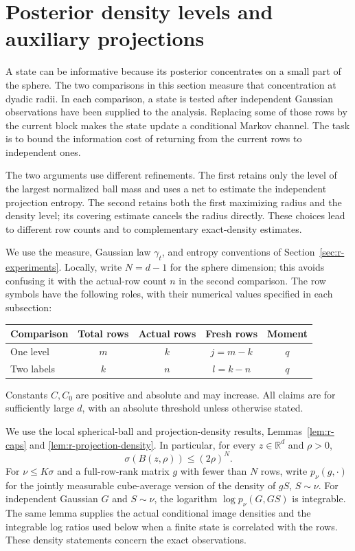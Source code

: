 \section{Posterior density levels and auxiliary projections}
\label{rlevels:section}\label{sec:r-density-levels}

A state can be informative because its posterior concentrates on a small
part of the sphere.  The two comparisons in this section measure that
concentration at dyadic radii.  In each comparison, a state is tested
after independent Gaussian observations have been supplied to the
analysis.  Replacing some of those rows by the current block makes the
state update a conditional Markov channel.  The task is to bound the
information cost of returning from the current rows to independent ones.

The two arguments use different refinements.  The first retains only
the level of the largest normalized ball mass and uses a net to estimate
the independent projection entropy.  The second retains both the first
maximizing radius and the density level; its covering estimate cancels
the radius directly.  These choices lead to different row counts and
to complementary exact-density estimates.

We use the measure, Gaussian law \(\gamma_t\), and entropy conventions
of Section~\ref{sec:r-experiments}.  Locally, write \(N=d-1\) for
the sphere dimension; this avoids confusing it with the actual-row
count \(n\) in the second comparison.  The row symbols have the
following roles, with their numerical values specified in each
subsection:
\begin{center}
\begin{tabular}{lcccc}
\toprule
Comparison & Total rows & Actual rows & Fresh rows & Moment \\
\midrule
One level & \(m\) & \(k\) & \(j=m-k\) & \(q\) \\
Two labels & \(k\) & \(n\) & \(l=k-n\) & \(q\) \\
\bottomrule
\end{tabular}
\end{center}
Constants \(C,C_0\) are positive and absolute and may increase.
All claims are for sufficiently large \(d\), with an absolute
threshold unless otherwise stated.

We use the local spherical-ball and projection-density results,
Lemmas~\ref{lem:r-caps} and \ref{lem:r-projection-density}.  In
particular, for every \(z\in\mathbb R^d\) and \(\rho>0\),
\begin{equation}\label{rlevels:ambient-cap}
 \sigma(B(z,\rho))\le (2\rho)^N.
\end{equation}
For \(\nu\le K\sigma\) and a full-row-rank matrix \(g\) with fewer
than \(N\) rows, write \(p_\nu(g,\cdot)\) for the jointly measurable
cube-average version of the density of \(gS\), \(S\sim\nu\).
For independent Gaussian \(G\) and \(S\sim\nu\), the logarithm
\(\log p_\nu(G,GS)\) is integrable.
The same lemma supplies the actual conditional image densities and
the integrable log ratios used below when a finite state is correlated
with the rows.  These density statements concern the exact
observations.

